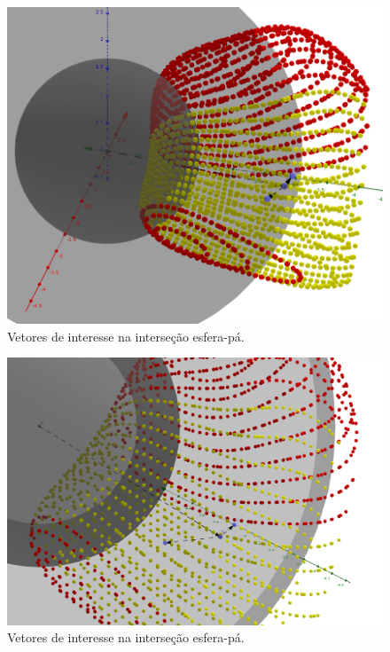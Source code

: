 \begin{figure}[!ht]
	\centering
	\includegraphics[width=\columnwidth]{figs/planejamento/vetores_out.png}
	\caption{Vetores de interesse na interseção esfera-pá.}
	\label{fig::vetores_out}
\end{figure}

\begin{figure}[!ht]
	\centering
	\includegraphics[width=\columnwidth]{figs/planejamento/vetores_out2.png}
	\caption{Vetores de interesse na interseção esfera-pá.}
	\label{fig::vetores_out2}
\end{figure}

